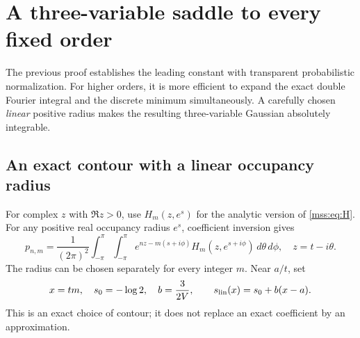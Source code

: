 \documentclass[11pt,letterpaper]{article}
\numberwithin{equation}{section}
\theoremstyle{definition}\newtheorem{definition}[theorem]{Definition}
\theoremstyle{remark}\newtheorem{remark}[theorem]{Remark}
\begin{document}
\section{A three-variable saddle to every fixed order}\label{mss:sec:allorders}
The previous proof establishes the leading constant with transparent probabilistic normalization. For higher orders, it is more efficient to expand the exact double Fourier integral and the discrete minimum simultaneously. A carefully chosen \emph{linear} positive radius makes the resulting three-variable Gaussian absolutely integrable.

\subsection{An exact contour with a linear occupancy radius}
For complex $z$ with $\Re z>0$, use $H_m(z,e^s)$ for the analytic version of \eqref{mss:eq:H}. For any positive real occupancy radius $e^s$, coefficient inversion gives
\begin{equation}\label{mss:eq:exactcontour}
p_{n,m}=\frac1{(2\pi)^2}\int_{-\pi}^{\pi}\int_{-\pi}^{\pi}
e^{nz-m(s+i\phi)}H_m(z,e^{s+i\phi})\,d\theta\,d\phi,
\quad z=t-i\theta.
\end{equation}
The radius can be chosen separately for every integer $m$. Near $a/t$, set
\begin{equation}\label{mss:eq:linradius}
x=tm,\quad s_0=-\log2,\quad b=\frac3{2V},\qquad
s_{\rm lin}(x)=s_0+b(x-a).
\end{equation}
This is an exact choice of contour; it does not replace an exact coefficient by an approximation.
\end{document}
